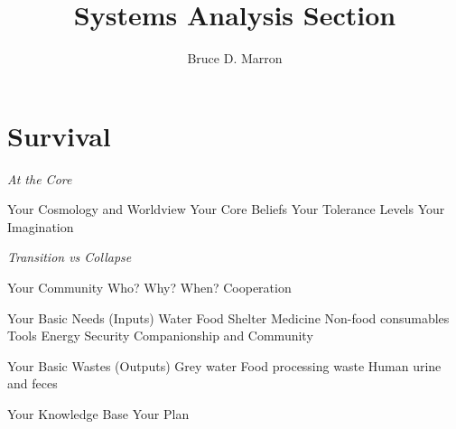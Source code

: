 \documentclass[12pt, letterpaper]{article}
\title{\vspace{-15mm}\fontsize{14pt}{10pt}
                    \selectfont \textbf{Systems Analysis Section}   %
                    \vspace{-7mm}
      }
\author{
     \normalsize Bruce D. Marron \\                     %
     \vspace{-5mm}
  }
\begin{document}
\begin{singlespacing}
\end{singlespacing}
\thispagestyle{fancy}                           %


\section{Survival}

\large
\begin{flushleft}
\textit{At the Core}
\end{flushleft}

\normalsize
\begin{outline}[enumerate]
\1 Your Cosmology and Worldview
\2 Your Core Beliefs
\2 Your Tolerance Levels
\2 Your Imagination
\end{outline}

\large
\begin{flushleft}
\textit{Transition vs Collapse}
\end{flushleft}

\normalsize
\begin{outline}[enumerate]
\1 Your Community
\2 Who? 
\2 Why?
\2 When?
\2 Cooperation

\1 Your Basic Needs (Inputs)
\2 Water
\2 Food
\2 Shelter
\2 Medicine
\2 Non-food consumables
\2 Tools
\2 Energy
\2 Security
\2 Companionship and Community

\1 Your Basic Wastes (Outputs)
\2 Grey water
\2 Food processing waste
\2 Human urine and feces
\2 

\1 Your Knowledge Base
\1 Your Plan


\end{outline}








\clearpage 
\renewcommand{\thepage}{}
\printbibliography
\end{document}
